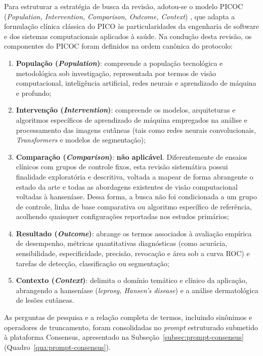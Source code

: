 Para estruturar a estratégia de busca da revisão, adotou-se o modelo PICOC
(\textit{Population, Intervention, Comparison, Outcome, Context}) \cite{kitchenham2007},
que adapta a formulação clínica clássica do PICO \cite{pai2004} às particularidades da engenharia
de software e dos sistemas computacionais aplicados à saúde. Na condução desta revisão, os
componentes do PICOC foram definidos na ordem canônica do protocolo:
\begin{enumerate}
\item \textbf{População (\textit{Population})}: compreende a população tecnológica e metodológica sob investigação, representada por termos de visão computacional, inteligência artificial, redes neurais e aprendizado de máquina e profundo;
\item \textbf{Intervenção (\textit{Intervention})}: compreende os modelos, arquiteturas e algoritmos específicos de aprendizado de máquina empregados na análise e processamento das imagens cutâneas (tais como redes neurais convolucionais, \textit{Transformers} e modelos de segmentação);
\item \textbf{Comparação (\textit{Comparison})}: \textbf{não aplicável}. Diferentemente de ensaios clínicos com grupos de controle fixos, esta revisão sistemática possui finalidade exploratória e descritiva, voltada a mapear de forma abrangente o estado da arte e todas as abordagens existentes de visão computacional voltadas à hanseníase. Dessa forma, a busca não foi condicionada a um grupo de controle, linha de base comparativa ou algoritmo específico de referência, acolhendo quaisquer configurações reportadas nos estudos primários;
\item \textbf{Resultado (\textit{Outcome})}: abrange os termos associados à avaliação empírica de desempenho, métricas quantitativas diagnósticas (como acurácia, sensibilidade, especificidade, precisão, revocação e área sob a curva ROC) e tarefas de detecção, classificação ou segmentação;
\item \textbf{Contexto (\textit{Context})}: delimita o domínio temático e clínico da aplicação, abrangendo a hanseníase (\textit{leprosy, Hansen's disease}) e a análise dermatológica de lesões cutâneas.
\end{enumerate}

As perguntas de pesquisa e a relação completa de termos, incluindo sinônimos e operadores de truncamento, foram consolidadas no \textit{prompt} estruturado submetido à plataforma Consensus, apresentado na Subseção~\ref{subsec:prompt-consensus} (Quadro~\ref{qua:prompt-consensus}).

